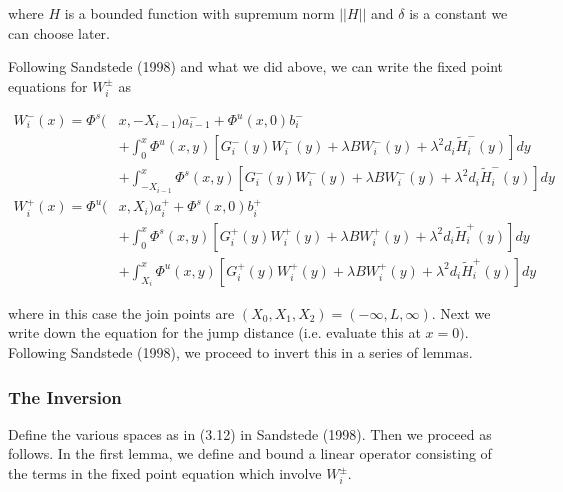 \documentclass[12pt]{article}
\begin{document}
where $H$ is a bounded function with supremum norm $||H||$ and $\delta$ is a constant we can choose later.

Following Sandstede (1998) and what we did above, we can write the fixed point equations for $W_i^\pm$ as

\begin{align*}
W_i^-(x) = \Phi^s(&x, -X_{i-1})a_{i-1}^- + \Phi^u(x, 0)b_i^- \\
&+ \int_0^x \Phi^u(x, y)[G_i^-(y) W_i^-(y) + \lambda B W_i^-(y) + \lambda^2 d_i \tilde{H}_i^-(y) ] dy \\
&+ \int_{-X_{i-1}}^x \Phi^s(x, y)[G_i^-(y) W_i^-(y) + \lambda B W_i^-(y) + \lambda^2 d_i \tilde{H}_i^-(y) ] dy \\
W_i^+(x) = \Phi^u(&x, X_i)a_i^+ + \Phi^s(x, 0)b_i^+ \\
&+ \int_0^x \Phi^s(x, y)[G_i^+(y) W_i^+(y) + \lambda B W_i^+(y) + \lambda^2 d_i \tilde{H}_i^+(y)] dy \\
&+ \int_{X_i}^x \Phi^u(x, y)[G_i^+(y) W_i^+(y) + \lambda B W_i^+(y) + \lambda^2 d_i \tilde{H}_i^+(y)]dy
\end{align*}

where in this case the join points are $(X_0, X_1, X_2) = (-\infty, L, \infty)$. Next we write down the equation for the jump distance (i.e. evaluate this at $x = 0)$. \\

Following Sandstede (1998), we proceed to invert this in a series of lemmas. 

\subsubsection*{The Inversion}

Define the various spaces as in (3.12) in Sandstede (1998). Then we proceed as follows. In the first lemma, we define and bound a linear operator consisting of the terms in the fixed point equation which involve $W_i^\pm$.
\end{document}
